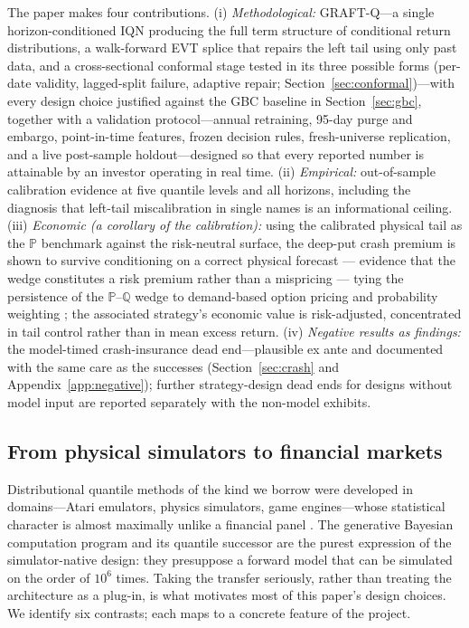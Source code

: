 \documentclass[11pt]{article}
\newcommand{\Q}{\mathbb{Q}}
\newcommand{\PP}{\mathbb{P}}
\begin{document}
The paper makes four contributions. (i) \emph{Methodological:} GRAFT-Q---a single horizon-conditioned IQN producing the full term structure of conditional return distributions, a walk-forward EVT splice that repairs the left tail using only past data, and a cross-sectional conformal stage tested in its three possible forms (per-date validity, lagged-split failure, adaptive repair; Section~\ref{sec:conformal})---with every design choice justified against the GBC baseline \citep{polson2023gbc, nareklishvili2025gqbp} in Section~\ref{sec:gbc}, together with a validation protocol---annual retraining, 95-day purge and embargo, point-in-time features, frozen decision rules, fresh-universe replication, and a live post-sample holdout---designed so that every reported number is attainable by an investor operating in real time. (ii) \emph{Empirical:} out-of-sample calibration evidence at five quantile levels and all horizons, including the diagnosis that left-tail miscalibration in single names is an informational ceiling. (iii) \emph{Economic (a corollary of the calibration):} using the calibrated physical tail as the $\PP$ benchmark against the risk-neutral surface, the deep-put crash premium is shown to survive conditioning on a correct physical forecast --- evidence that the wedge constitutes a risk premium rather than a mispricing --- tying the persistence of the $\PP$--$\Q$ wedge to demand-based option pricing \citep{garleanu2009} and probability weighting \citep{tversky1992, barberishuang2008}; the associated strategy's economic value is risk-adjusted, concentrated in tail control rather than in mean excess return. (iv) \emph{Negative results as findings:} the model-timed crash-insurance dead end---plausible ex ante and documented with the same care as the successes (Section~\ref{sec:crash} and Appendix~\ref{app:negative}); further strategy-design dead ends for designs without model input are reported separately with the non-model exhibits.

\subsection{From physical simulators to financial markets}\label{sec:simulators}

Distributional quantile methods of the kind we borrow were developed in domains---Atari emulators, physics simulators, game engines---whose statistical character is almost maximally unlike a financial panel \citep{bellemare2017c51, dabney2018qrdqn, dabney2018iqn}. The generative Bayesian computation program \citep{polson2023gbc} and its quantile successor \citep{nareklishvili2025gqbp} are the purest expression of the simulator-native design: they presuppose a forward model that can be simulated on the order of $10^6$ times. Taking the transfer seriously, rather than treating the architecture as a plug-in, is what motivates most of this paper's design choices. We identify six contrasts; each maps to a concrete feature of the project.
\end{document}
